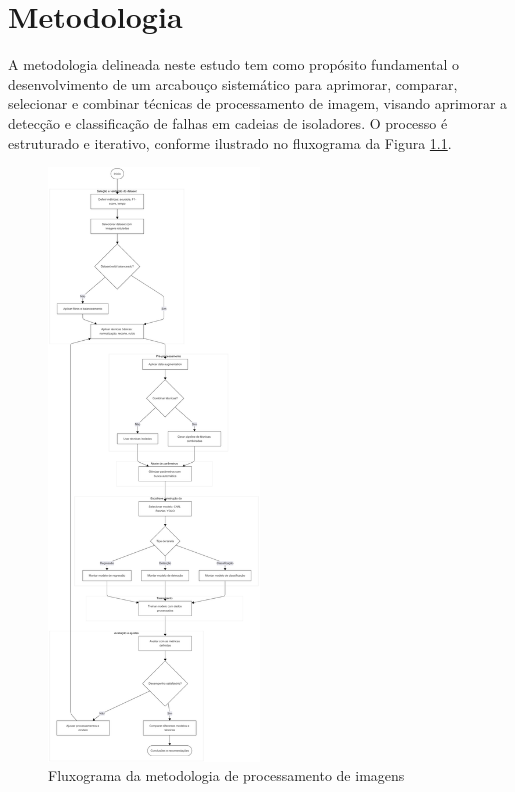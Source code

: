 \chapter{Metodologia}

A metodologia delineada neste estudo tem como propósito fundamental o desenvolvimento de um arcabouço sistemático para aprimorar, comparar, selecionar e combinar técnicas de processamento de imagem, visando aprimorar a detecção e classificação de falhas em cadeias de isoladores. O processo é estruturado e iterativo, conforme ilustrado no fluxograma da Figura \ref{fig:fluxograma_metodologia}.

\begin{figure}[H]
    \centering
    \caption{\label{fig:fluxograma_metodologia}Fluxograma da metodologia de processamento de imagens}
    \includegraphics[width=0.5\textwidth]{img/metodologia.png}
\end{figure}

